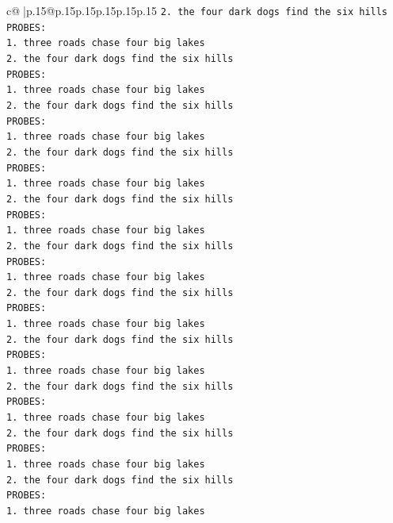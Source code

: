 \documentclass{article}
\begin{document}
{\begin{supertabular}{c@{$\;$}|p{.15\linewidth}@{}p{.15\linewidth}p{.15\linewidth}p{.15\linewidth}p{.15\linewidth}p{.15\linewidth}}
{{{\texttt{2. the four dark dogs find the six hills} \\
\texttt{PROBES:} \\
\texttt{1. three roads chase four big lakes} \\
\texttt{2. the four dark dogs find the six hills} \\
\texttt{PROBES:} \\
\texttt{1. three roads chase four big lakes} \\
\texttt{2. the four dark dogs find the six hills} \\
\texttt{PROBES:} \\
\texttt{1. three roads chase four big lakes} \\
\texttt{2. the four dark dogs find the six hills} \\
\texttt{PROBES:} \\
\texttt{1. three roads chase four big lakes} \\
\texttt{2. the four dark dogs find the six hills} \\
\texttt{PROBES:} \\
\texttt{1. three roads chase four big lakes} \\
\texttt{2. the four dark dogs find the six hills} \\
\texttt{PROBES:} \\
\texttt{1. three roads chase four big lakes} \\
\texttt{2. the four dark dogs find the six hills} \\
\texttt{PROBES:} \\
\texttt{1. three roads chase four big lakes} \\
\texttt{2. the four dark dogs find the six hills} \\
\texttt{PROBES:} \\
\texttt{1. three roads chase four big lakes} \\
\texttt{2. the four dark dogs find the six hills} \\
\texttt{PROBES:} \\
\texttt{1. three roads chase four big lakes} \\
\texttt{2. the four dark dogs find the six hills} \\
\texttt{PROBES:} \\
\texttt{1. three roads chase four big lakes} \\
\texttt{2. the four dark dogs find the six hills} \\
\texttt{PROBES:} \\
\texttt{1. three roads chase four big lakes} \\
}}}
\end{supertabular}}
\end{document}
